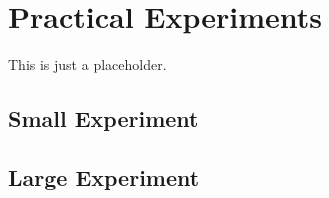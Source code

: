 \chapter{Practical Experiments}
\label{chapter:experiments}

This is just a placeholder.

\section{Small Experiment}
\label{section:smallExperiment}

\section{Large Experiment}
\label{section:largeExperiment}